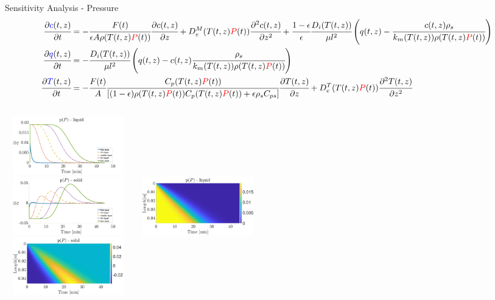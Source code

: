 \documentclass[8pt]{beamer}
\begin{document}
	\begin{frame}[fragile]{Sensitivity Analysis - Pressure}
		\tiny{
			\begin{align*}
				\cfrac{\partial \textcolor{blue}{c}(t,z)}{\partial t} &=  -\cfrac{F(t)}{\epsilon A\rho(T(t,z)\textcolor{red}{P}(t))} \cfrac{\partial c(t,z)}{\partial z} 
				+ D^M_e(T(t,z)\textcolor{red}{P}(t)) \cfrac{\partial^2 c(t,z)}{\partial z^2} + \cfrac{1-\epsilon}{\epsilon} \cfrac{D_i(T(t,z))}{\mu l^2 }\left(q(t,z) - \cfrac{c(t,z)\rho_s}{k_m(T(t,z))\rho(T(t,z)\textcolor{red}{P}(t))} \right)\\
				\cfrac{\partial \textcolor{blue}{q}(t,z)}{\partial t} &= -\cfrac{D_i(T(t,z))}{\mu l^2 }\left(q(t,z) - c(t,z) \cfrac{\rho_s}{k_m(T(t,z))\rho(T(t,z)\textcolor{red}{P}(t))} \right)\\
				\cfrac{\partial \textcolor{blue}{T}(t,z)}{\partial t} &= -\cfrac{F(t)}{A} \cfrac{C_p(T(t,z)\textcolor{red}{P}(t))}{ [(1-\epsilon)\rho(T(t,z)\textcolor{red}{P}(t)) C_p(T(t,z)\textcolor{red}{P}(t)) + \epsilon \rho_s C_{ps} ]} \cfrac{\partial T(t,z)}{\partial z} 
				+ D^T_e(T(t,z)\textcolor{red}{P}(t)) \cfrac{\partial^2 T(t,z)}{\partial z^2}
		\end{align*}}
		\begin{columns}[t]
			\centering
			\includegraphics[width=5.5cm,height=2.5cm]{Figures/Sensitivity/Plots/2_SS_R_P.png}\\
			\includegraphics[width=5.5cm,height=2.5cm]{Figures/Sensitivity/Plots/3_SS_R_P.png}
			\centering
			\includegraphics[width=5.5cm,height=2.5cm]{Figures/Sensitivity/Imagesc/2_SS_R_P.png}\\
			\includegraphics[width=5.5cm,height=2.5cm]{Figures/Sensitivity/Imagesc/3_SS_R_P.png}
		\end{columns}
	\end{frame}
\end{document}
